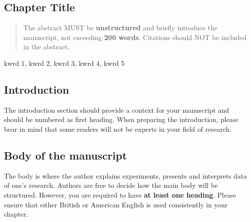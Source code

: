 \documentclass[numbers,sort&compress]{IntechOpen-Book}%
\begin{document}
\Mainmatter

\begin{frontmatter}

\chapter{Chapter Title}
\author{Author 1}
\author{Author 2}
\author{Author 3}

\makechaptertitle


\begin{abstract} %
The abstract MUST be \textbf{unstructured} and briefly introduce the manuscript, not exceeding \textbf{200 words}. Citations should NOT be included in the abstract.
\end{abstract}

\begin{keywords} %
kwrd 1, kwrd 2, kwrd 3, kwrd 4, kwrd 5
\end{keywords}


\end{frontmatter}



\section{Introduction} %

The introduction section should provide a context for your manuscript and should be numbered as first heading. When preparing the introduction, please bear in mind that some readers will not be experts in your field of research.

\section{Body of the manuscript}

The body is where the author explains experiments, presents and interprets data of one's research. Authors are free to decide how the main body will be structured. However, you are required to have \textbf{at least one heading}. Please ensure that either British or American English is used consistently in your chapter.
\end{document}
